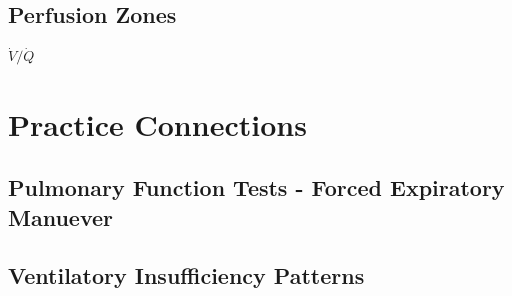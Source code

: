 \subsection{Perfusion Zones}
$\dot{V}/\dot{Q}$

\section{Practice Connections}

\subsection{Pulmonary Function Tests - Forced Expiratory Manuever}

\subsection{Ventilatory Insufficiency Patterns}

\printbibliography[heading=subbibintoc]